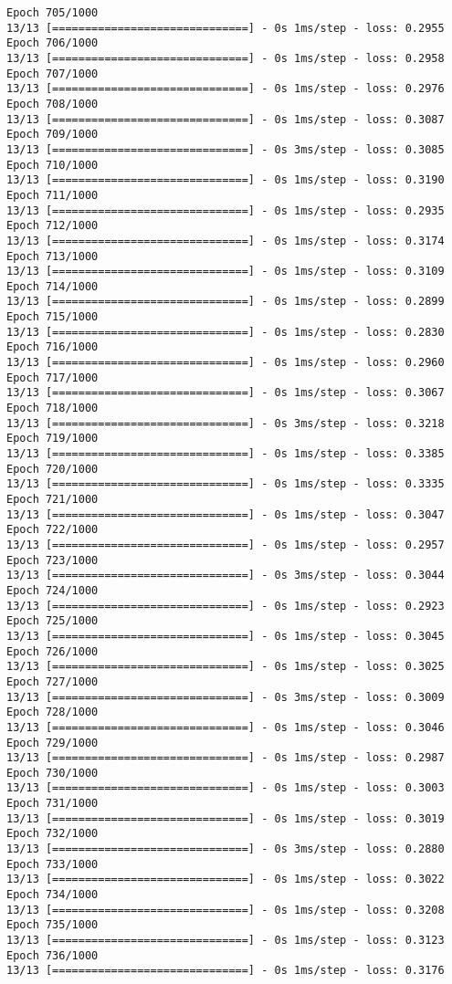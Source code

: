 \documentclass[11pt]{article}
\begin{document}
\begin{Verbatim}[commandchars=\\\{\}]
Epoch 705/1000
13/13 [==============================] - 0s 1ms/step - loss: 0.2955
Epoch 706/1000
13/13 [==============================] - 0s 1ms/step - loss: 0.2958
Epoch 707/1000
13/13 [==============================] - 0s 1ms/step - loss: 0.2976
Epoch 708/1000
13/13 [==============================] - 0s 1ms/step - loss: 0.3087
Epoch 709/1000
13/13 [==============================] - 0s 3ms/step - loss: 0.3085
Epoch 710/1000
13/13 [==============================] - 0s 1ms/step - loss: 0.3190
Epoch 711/1000
13/13 [==============================] - 0s 1ms/step - loss: 0.2935
Epoch 712/1000
13/13 [==============================] - 0s 1ms/step - loss: 0.3174
Epoch 713/1000
13/13 [==============================] - 0s 1ms/step - loss: 0.3109
Epoch 714/1000
13/13 [==============================] - 0s 1ms/step - loss: 0.2899
Epoch 715/1000
13/13 [==============================] - 0s 1ms/step - loss: 0.2830
Epoch 716/1000
13/13 [==============================] - 0s 1ms/step - loss: 0.2960
Epoch 717/1000
13/13 [==============================] - 0s 1ms/step - loss: 0.3067
Epoch 718/1000
13/13 [==============================] - 0s 3ms/step - loss: 0.3218
Epoch 719/1000
13/13 [==============================] - 0s 1ms/step - loss: 0.3385
Epoch 720/1000
13/13 [==============================] - 0s 1ms/step - loss: 0.3335
Epoch 721/1000
13/13 [==============================] - 0s 1ms/step - loss: 0.3047
Epoch 722/1000
13/13 [==============================] - 0s 1ms/step - loss: 0.2957
Epoch 723/1000
13/13 [==============================] - 0s 3ms/step - loss: 0.3044
Epoch 724/1000
13/13 [==============================] - 0s 1ms/step - loss: 0.2923
Epoch 725/1000
13/13 [==============================] - 0s 1ms/step - loss: 0.3045
Epoch 726/1000
13/13 [==============================] - 0s 1ms/step - loss: 0.3025
Epoch 727/1000
13/13 [==============================] - 0s 3ms/step - loss: 0.3009
Epoch 728/1000
13/13 [==============================] - 0s 1ms/step - loss: 0.3046
Epoch 729/1000
13/13 [==============================] - 0s 1ms/step - loss: 0.2987
Epoch 730/1000
13/13 [==============================] - 0s 1ms/step - loss: 0.3003
Epoch 731/1000
13/13 [==============================] - 0s 1ms/step - loss: 0.3019
Epoch 732/1000
13/13 [==============================] - 0s 3ms/step - loss: 0.2880
Epoch 733/1000
13/13 [==============================] - 0s 1ms/step - loss: 0.3022
Epoch 734/1000
13/13 [==============================] - 0s 1ms/step - loss: 0.3208
Epoch 735/1000
13/13 [==============================] - 0s 1ms/step - loss: 0.3123
Epoch 736/1000
13/13 [==============================] - 0s 1ms/step - loss: 0.3176

\end{Verbatim}
\end{document}
